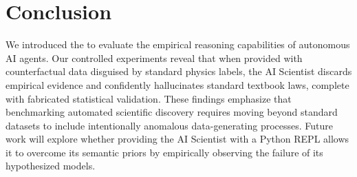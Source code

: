 \section{Conclusion}

We introduced the \methodname to evaluate the empirical reasoning capabilities of autonomous AI agents. Our controlled experiments reveal that when provided with counterfactual data disguised by standard physics labels, the AI Scientist discards empirical evidence and confidently hallucinates standard textbook laws, complete with fabricated statistical validation. These findings emphasize that benchmarking automated scientific discovery requires moving beyond standard datasets to include intentionally anomalous data-generating processes. Future work will explore whether providing the AI Scientist with a Python REPL allows it to overcome its semantic priors by empirically observing the failure of its hypothesized models.
